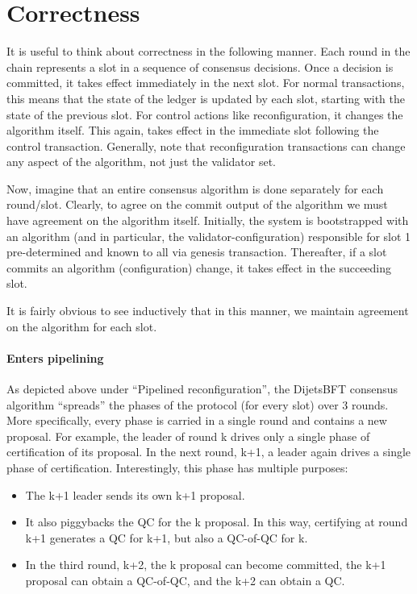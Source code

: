 \section{Correctness} \label{correctness}

It is useful to think about correctness in the following manner. Each round in the chain represents a slot in a sequence of consensus decisions.
Once a decision is committed, it takes effect immediately in the next slot. For normal transactions, this means that the state of the ledger is
updated by each slot, starting with the state of the previous slot. For control actions like reconfiguration, it changes the algorithm itself.
This again, takes effect in the immediate slot following the control transaction.
Generally, note that reconfiguration transactions can change any aspect of the algorithm, not just the validator set.

Now, imagine that an entire consensus algorithm is done separately for each round/slot. Clearly, to agree on the commit output of the algorithm
we must have agreement on the algorithm itself. Initially, the system is bootstrapped with an algorithm (and in particular, the
validator-configuration) responsible for slot 1 pre-determined and known to all via genesis transaction. Thereafter, if a slot commits an algorithm (configuration) change,
it takes effect in the succeeding slot.

It is fairly obvious to see inductively that in this manner, we maintain agreement on the algorithm for each slot.

\paragraph{Enters pipelining}

As depicted above under “Pipelined reconfiguration”, the DijetsBFT consensus algorithm “spreads” the phases of the protocol (for every slot) over
3 rounds. More specifically, every phase is carried in a single round and contains a new proposal. For example, the leader of round k drives only
a single phase of certification of its proposal. In the next round, k+1, a leader again drives a single phase of certification. Interestingly,
this phase has multiple purposes:
\begin{itemize}
\item The k+1 leader sends its own k+1 proposal.
\item It also piggybacks the QC for the k proposal. In this way, certifying at round k+1 generates a QC for k+1, but also a QC-of-QC for k.
\item In the third round, k+2, the k proposal can become committed, the k+1 proposal can obtain a QC-of-QC, and the k+2 can obtain a QC.
\end{itemize}

